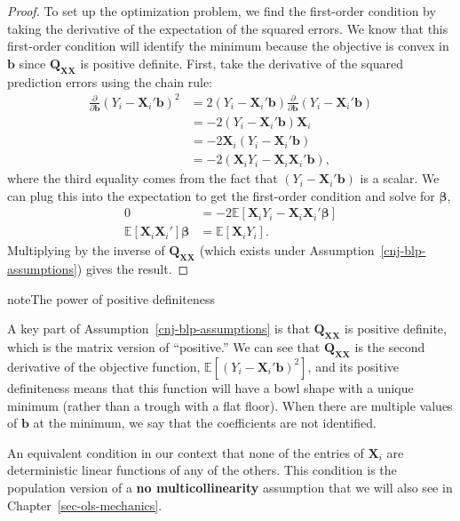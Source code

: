 \documentclass[
  13pt,
  letterpaper,
  DIV=11,
  numbers=noendperiod]{scrreprt}
\newcounter{none} %
\newcommand{\mb}{\bm}
\newcommand{\E}{\mathbb{E}}
\newcommand{\X}{\mb{X}}
\newcommand{\bfbeta}{\mb{\beta}}
\theoremstyle{plain}
\theoremstyle{plain}
\theoremstyle{definition}
\theoremstyle{definition}
\theoremstyle{remark}
\begin{document}
\begin{proof}
To set up the optimization problem, we find the first-order condition by
taking the derivative of the expectation of the squared errors. We know
that this first-order condition will identify the minimum because the
objective is convex in \(\mb{b}\) since \(\mb{Q}_{\X\X}\) is positive
definite. First, take the derivative of the squared prediction errors
using the chain rule: \[ 
\begin{aligned}
  \frac{\partial}{\partial \mb{b}}\left(Y_{i} - \X_{i}'\mb{b}\right)^{2}
  &= 2\left(Y_{i} - \X_{i}'\mb{b}\right)\frac{\partial}{\partial \mb{b}}(Y_{i} - \X_{i}'\mb{b}) \\
  &= -2\left(Y_{i} - \X_{i}'\mb{b}\right)\X_{i} \\
  &= -2\X_{i}\left(Y_{i} - \X_{i}'\mb{b}\right) \\
  &= -2\left(\X_{i}Y_{i} - \X_{i}\X_{i}'\mb{b}\right),
\end{aligned}
\] where the third equality comes from the fact that
\((Y_{i} - \X_{i}'\mb{b})\) is a scalar. We can plug this into the
expectation to get the first-order condition and solve for \(\bfbeta\),
\[ 
\begin{aligned}
  0 &= -2\E[\X_{i}Y_{i} - \X_{i}\X_{i}'\bfbeta ] \\
  \E[\X_{i}\X_{i}'] \bfbeta &= \E[\X_{i}Y_{i}].
\end{aligned}
\] Multiplying by the inverse of \(\mb{Q}_{\mb{XX}}\) (which exists
under Assumption~\ref{cnj-blp-assumptions}) gives the result.
\end{proof}

\begin{bookcallout}{note}{The power of positive definiteness}

A key part of Assumption~\ref{cnj-blp-assumptions} is that
\(\mb{Q}_{\mb{XX}}\) is positive definite, which is the matrix version
of ``positive.'' We can see that \(\mb{Q}_{\mb{XX}}\) is the second
derivative of the objective function,
\(\E\left[ \left(Y_{i} - \mb{X}_{i}'\mb{b} \right)^2\right]\), and its
positive definiteness means that this function will have a bowl shape
with a unique minimum (rather than a trough with a flat floor). When
there are multiple values of \(\mb{b}\) at the minimum, we say that the
coefficients are not identified.

An equivalent condition in our context that none of the entries of
\(\X_i\) are deterministic linear functions of any of the others. This
condition is the population version of a \textbf{no multicollinearity}
assumption that we will also see in Chapter~\ref{sec-ols-mechanics}.

\end{bookcallout}
\end{document}
